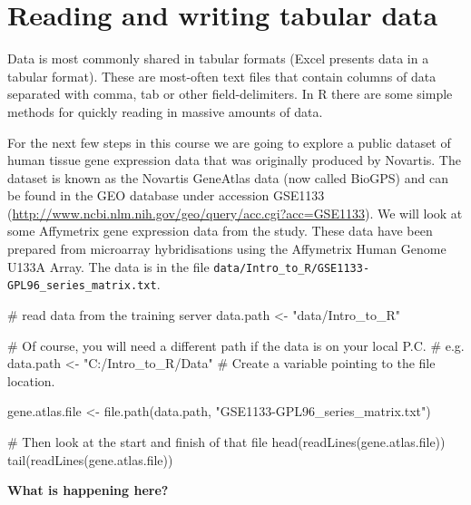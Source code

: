 \documentclass[a4paper]{book}
\newenvironment{Shaded}{}{}
\newcommand{\KeywordTok}[1]{\textcolor[rgb]{0.00,0.00,1.00}{{#1}}}
\newcommand{\StringTok}[1]{\textcolor[rgb]{0.00,0.50,0.50}{{#1}}}
\newcommand{\CommentTok}[1]{\textcolor[rgb]{0.00,0.50,0.00}{{#1}}}
\newcommand{\NormalTok}[1]{{#1}}
\newlength{\leftbarwidth}
\newlength{\leftbarsep}
\newcommand*{\leftbarcolorcmd}{\color{darkgray}}%
\renewenvironment{leftbar}{%
    \def\FrameCommand{{\leftbarcolorcmd{\vrule width \leftbarwidth\relax\hspace {\leftbarsep}}}}%
    \MakeFramed {\advance \hsize -\width \FrameRestore }%
}{%
    \endMakeFramed
}
\renewenvironment{Shaded}
{\vspace{0em}\begin{leftbar}\begin{snugshade}}
{\end{snugshade}\end{leftbar}\vspace{0pt}}
\begin{document}
\section{Reading and writing tabular
data}\label{reading-and-writing-tabular-data}

Data is most commonly shared in tabular formats (Excel presents data in
a tabular format). These are most-often text files that contain columns
of data separated with comma, tab or other field-delimiters. In R there
are some simple methods for quickly reading in massive amounts of data.

For the next few steps in this course we are going to explore a public
dataset of human tissue gene expression data that was originally
produced by Novartis. The dataset is known as the Novartis GeneAtlas
data (now called BioGPS) and can be found in the GEO database under
accession GSE1133
(\url{http://www.ncbi.nlm.nih.gov/geo/query/acc.cgi?acc=GSE1133}). We
will look at some Affymetrix gene expression data from the study. These
data have been prepared from microarray hybridisations using the
Affymetrix Human Genome U133A Array. The data is in the file
\texttt{data/Intro\_to\_R/GSE1133-GPL96\_series\_matrix.txt}.

\begin{Shaded}
\begin{Highlighting}[]
\CommentTok{# read data from the training server}
\NormalTok{data.path <-}\StringTok{ "data/Intro_to_R"}

\CommentTok{# Of course, you will need a different path if the data is on your local P.C.}
\CommentTok{# e.g. data.path <- "C:/Intro_to_R/Data"}
\CommentTok{# Create a variable pointing to the file location.}

\NormalTok{gene.atlas.file <-}\StringTok{ }\KeywordTok{file.path}\NormalTok{(data.path, }\StringTok{"GSE1133-GPL96_series_matrix.txt"}\NormalTok{)}

\CommentTok{# Then look at the start and finish of that file}
\KeywordTok{head}\NormalTok{(}\KeywordTok{readLines}\NormalTok{(gene.atlas.file))}
\KeywordTok{tail}\NormalTok{(}\KeywordTok{readLines}\NormalTok{(gene.atlas.file))}
\end{Highlighting}
\end{Shaded}

\textbf{What is happening here?}
\end{document}
